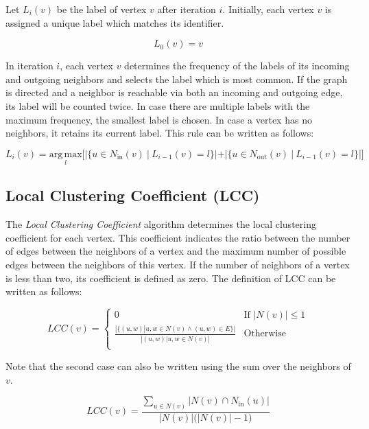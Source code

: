 Let $L_i(v)$ be the label of vertex $v$ after iteration $i$. Initially, each vertex $v$ is assigned a unique label which matches its identifier.

\begin{equation}
L_0(v) = v
\end{equation}

In iteration $i$, each vertex $v$ determines the frequency of the labels of its incoming and outgoing neighbors and selects the label which is most common.  If the graph is directed and a neighbor is reachable via both an incoming and outgoing edge, its label will be counted twice. In case there are multiple labels with the maximum frequency, the smallest label is chosen. In case a vertex has no neighbors, it retains its current label. This rule can be written as follows:

\begin{equation}
L_i(v) = \underset{l}{\mathrm{arg\,max}} \Big[ |\{ u \in N_\mathrm{in}(v)~|~L_{i-1}(v) = l \}| + |\{ u \in N_\mathrm{out}(v)~|~L_{i-1}(v) = l \}| \Big]
\end{equation}


\subsection{Local Clustering Coefficient (LCC)}
The \emph{Local Clustering Coefficient} algorithm determines the local clustering coefficient for each vertex. This coefficient indicates the ratio between the number of edges between the neighbors of a vertex and the maximum number of possible edges between the neighbors of this vertex. If the number of neighbors of a vertex is less than two, its coefficient is defined as zero. The definition of LCC can be written as follows:

\begin{equation}
LCC(v) = \begin{cases}
0 & \text{If } |N(v)| \leq 1 \\
\frac{|\{(u, w) | u, w \in N(v) \wedge (u, w) \in E\}|}
{|{(u,w) | u, w \in N(v)}|} & \text{Otherwise} \\
\end{cases}
\end{equation}

Note that the second case can also be written using the sum over the neighbors of $v$.

\begin{equation}
LCC(v) = \frac{\sum_{u \in N(v)} |N(v) \cap N_\mathrm{in}(u)|}{|N(v)| \big( |N(v)| - 1 \big)} 
\end{equation}



